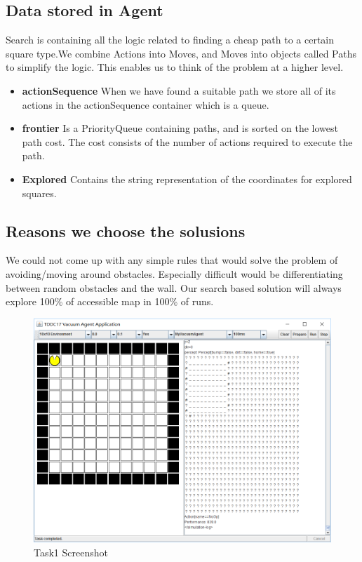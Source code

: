 \subsection{Data stored in Agent}
Search is containing all the logic related to finding a cheap path to a certain square type.We combine Actions into Moves, and Moves into objects called Paths to simplify the logic. This enables us to think of the problem at a higher level.
\begin{itemize}
	\item \textbf{actionSequence}
When we have found a suitable path we store all of its actions in the actionSequence container which is a queue.
	\item \textbf{frontier}
Is a PriorityQueue containing paths, and is sorted on the lowest path cost. The cost consists of the number of actions required to execute the path.
	\item \textbf{Explored}
Contains the string representation of the coordinates for explored squares.
\end{itemize}
\subsection{Reasons we choose the solusions }
We could not come up with any simple rules that would solve the problem of avoiding/moving around obstacles. Especially difficult would be differentiating between random obstacles and the wall. Our search based solution will always explore 100\% of accessible map in 100\% of runs.

\begin{figure}[h]
    \centering
      \includegraphics[width=0.83\linewidth]{./images/task1.png}
    \caption{Task1 Screenshot\label{VacuumAgent}}
\end{figure}


